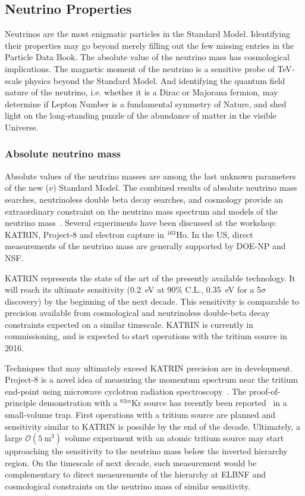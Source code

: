 \subsection{Neutrino Properties}
\label{sec:Properties}

Neutrinos are the most enigmatic particles in the Standard
Model. Identifying their properties may go beyond merely filling out
the few missing entries in the Particle Data Book. The absolute value
of the neutrino mass has cosmological implications. The magnetic
moment of the neutrino is a sensitive probe of TeV-scale physics
beyond the Standard Model. And identifying the quantum field nature of
the neutrino, i.e. whether it is a Dirac or Majorana fermion, may
determine if Lepton Number is a fundamental symmetry of Nature, and
shed light on the long-standing puzzle of the abundance of matter in
the visible Universe.

\subsubsection{Absolute neutrino mass}

Absolute values of the neutrino masses are among the last unknown
parameters of the new ($\nu$) Standard Model.  The combined results of
absolute neutrino mass searches, neutrinoless double beta decay
searches, and cosmology provide an extraordinary constraint on the
neutrino mass spectrum and models of the neutrino
mass~\cite{Bahcall:2004ip}.  Several experiments have been discussed
at the workshop: KATRIN, Project-8 and electron capture in
$^{163}$Ho. In the US, direct measurements of the neutrino mass are
generally supported by DOE-NP and NSF.

KATRIN represents the state of the art of the presently available
technology. It will reach its ultimate sensitivity ($0.2$~eV at 90\%
C.L., $0.35$~eV for a 5$\sigma$ discovery) by the beginning of the
next decade. This sensitivity is comparable to precision available
from cosmological and neutrinoless double-beta decay constraints
expected on a similar timescale. KATRIN is currently in commissioning,
and is expected to start operations with the tritium source in 2016.

Techniques that may ultimately exceed KATRIN precision are in
development. Project-8 is a novel idea of measuring the momentum
spectrum near the tritium end-point using microwave cyclotron
radiation spectroscopy~\cite{Monreal:2009za}. The proof-of-principle
demonstration with a $^{83m}$Kr source has recently been
reported~\cite{Asner:2014cwa} in a small-volume trap. First operations
with a tritium source are planned and sensitivity similar to KATRIN is
possible by the end of the decade. Ultimately, a large
$\mathcal{O}(5~\mathrm{m}^3)$ volume experiment with an atomic tritium
source may start approaching the sensitivity to the neutrino mass
below the inverted hierarchy region. On the timescale of next decade,
such measurement would be complementary to direct measurements of the
hierarchy at ELBNF and cosmological constraints on the neutrino mass
of similar sensitivity.

